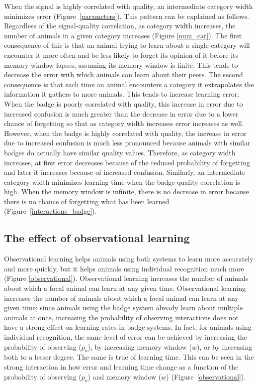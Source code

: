 When the signal is highly correlated with quality, an intermediate category width minimizes error (Figure~\ref{parameters}). This pattern can be explained as follows. Regardless of the signal-quality correlation, as category width increases, the number of animals in a given category increases (Figure \ref{num_cat}). The first consequence of this is that an animal trying to learn about a single category will encounter it more often and be less likely to forget its opinion of it before its memory window lapses, assuming its memory window is finite. This tends to decrease the error with which animals can learn about their peers. The second consequence is that each time an animal encounters a category it extrapolates the information it gathers to more animals. This tends to increase learning error. When the badge is poorly correlated with quality, this increase in error due to increased confusion is much greater than the decrease in error due to a lower chance of forgetting so that as category width increases error increases as well. However, when the badge is highly correlated with quality, the increase in error due to increased confusion is much less pronounced because animals with similar badges do actually have similar quality values. Therefore, as category width increases, at first error decreases because of the reduced probability of forgetting and later it increases because of increased confusion. Similarly, an intermediate category width minimizes learning time when the badge-quality correlation is high. When the memory window is infinite, there is no decrease in error because there is no chance of forgetting what has been learned (Figure~\ref{interactions_badge}).
%
\subsection*{The effect of observational learning}
Observational learning helps animals using both systems to learn more accurately and more quickly, but it helps animals using individual recognition much more (Figure \ref{observational}). Observational learning increases the number of animals about which a focal animal can learn at any given time. 
Observational learning increases the number of animals about which a focal animal can learn at any given time; since animals using the badge system already learn about multiple animals at once, increasing the probability of observing interactions does not have a strong effect on learning rates in badge systems.
In fact, for animals using individual recognition, the same level of error can be achieved by increasing the probability of observing ($p_\text{o}$), by increasing memory window ($w$), or by increasing both to a lesser degree. The same is true of learning time. This can be seen in the strong interaction in how error and learning time change as a function of the probability of observing ($p_\text{o}$) and memory window ($w$) (Figure~\ref{observational}).


